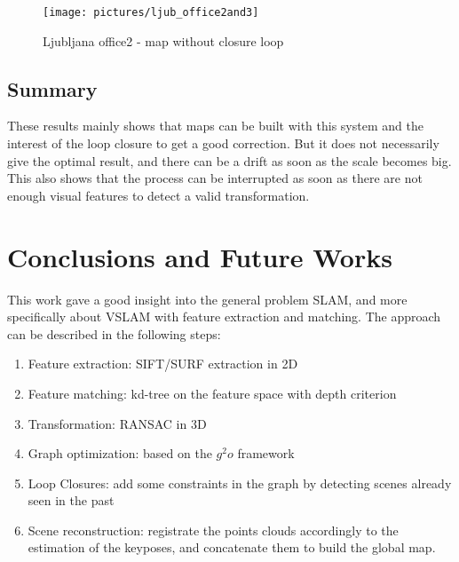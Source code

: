 \begin{figure}[H]
\centering
\texttt{[image: pictures/ljub\_office2and3]}
\caption{Ljubljana office2 - map without closure loop}
\end{figure}

\section{Summary}

These results mainly shows that maps can be built with this system and the interest of the loop closure to get a good correction. But it does not necessarily  give the optimal result, and there can be a drift as soon as the scale becomes big. This also shows that the process can be interrupted as soon as there are not enough visual features to detect a valid transformation.

%
%



\chapter{Conclusions and Future Works}
\label{chap:conclusion}

This work gave a good insight into the general problem \gls{SLAM}, and more specifically about \gls{VSLAM} with feature extraction and matching. The approach can be described in the following steps:
\begin{enumerate}
\item Feature extraction: \gls{SIFT}/\gls{SURF} extraction in 2D
\item Feature matching: kd-tree on the feature space with depth criterion
\item Transformation: \gls{RANSAC} in 3D
\item Graph optimization: based on the $g^2o$ framework
\item Loop Closures: add some constraints in the graph by detecting scenes already seen in the past
\item Scene reconstruction: registrate the points clouds accordingly to the estimation of the keyposes, and concatenate them to build the global map.
\end{enumerate}

